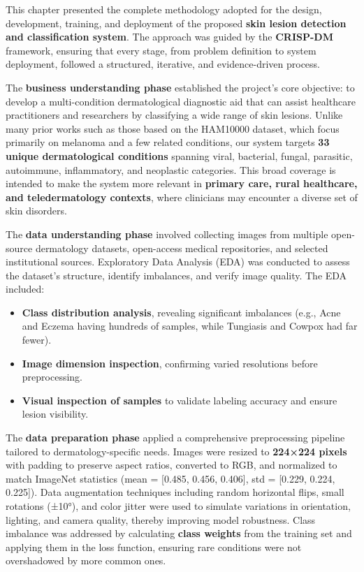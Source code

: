 \documentclass[
  12pt,
  oneside]{article}
\providecommand{\tightlist}{%
  \setlength{\itemsep}{0pt}\setlength{\parskip}{0pt}}
\begin{document}
This chapter presented the complete methodology adopted for the design,
development, training, and deployment of the proposed \textbf{skin
lesion detection and classification system}. The approach was guided by
the \textbf{CRISP-DM} framework, ensuring that every stage, from problem
definition to system deployment, followed a structured, iterative, and
evidence-driven process.

The \textbf{business understanding phase} established the project's core
objective: to develop a multi-condition dermatological diagnostic aid
that can assist healthcare practitioners and researchers by classifying
a wide range of skin lesions. Unlike many prior works such as those
based on the HAM10000 dataset, which focus primarily on melanoma and a
few related conditions, our system targets \textbf{33 unique
dermatological conditions} spanning viral, bacterial, fungal, parasitic,
autoimmune, inflammatory, and neoplastic categories. This broad coverage
is intended to make the system more relevant in \textbf{primary care,
rural healthcare, and teledermatology contexts}, where clinicians may
encounter a diverse set of skin disorders.

The \textbf{data understanding phase} involved collecting images from
multiple open-source dermatology datasets, open-access medical
repositories, and selected institutional sources. Exploratory Data
Analysis (EDA) was conducted to assess the dataset's structure, identify
imbalances, and verify image quality. The EDA included:

\begin{itemize}
\tightlist
\item
  \textbf{Class distribution analysis}, revealing significant imbalances
  (e.g., Acne and Eczema having hundreds of samples, while Tungiasis and
  Cowpox had far fewer).
\item
  \textbf{Image dimension inspection}, confirming varied resolutions
  before preprocessing.
\item
  \textbf{Visual inspection of samples} to validate labeling accuracy
  and ensure lesion visibility.
\end{itemize}

The \textbf{data preparation phase} applied a comprehensive
preprocessing pipeline tailored to dermatology-specific needs. Images
were resized to \textbf{224×224 pixels} with padding to preserve aspect
ratios, converted to RGB, and normalized to match ImageNet statistics
(mean = {[}0.485, 0.456, 0.406{]}, std = {[}0.229, 0.224, 0.225{]}).
Data augmentation techniques including random horizontal flips, small
rotations (±10°), and color jitter were used to simulate variations in
orientation, lighting, and camera quality, thereby improving model
robustness. Class imbalance was addressed by calculating \textbf{class
weights} from the training set and applying them in the loss function,
ensuring rare conditions were not overshadowed by more common ones.
\end{document}
